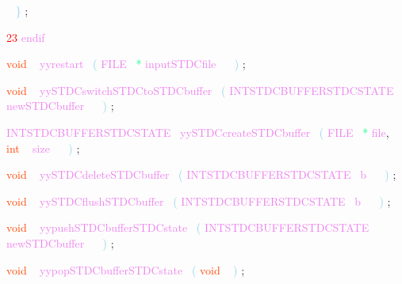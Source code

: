 \documentclass[8, usernames, dvipsnames]{beamer}
\begin{document}
\begin{frame}
\textcolor{White}{\   }
\textcolor{SkyBlue}{\} }
\textcolor{Sepia}{;}

  \textcolor{Red}{23}
\textcolor{Violet}{endif}\textcolor{White}{\ }

 
 \textcolor{OrangeRed}{void}
\textcolor{White}{\ }
\textcolor{Violet}{yyrestart}\textcolor{White}{\ }
\textcolor{SkyBlue}{(}
\textcolor{Violet}{FILE}\textcolor{White}{\ }
\textcolor{SpringGreen}{*}
\textcolor{Violet}{inputSTDCfile}\textcolor{White}{\ }
\textcolor{White}{\ }
\textcolor{SkyBlue}{)}
\textcolor{Sepia}{;}

 \textcolor{OrangeRed}{void}
\textcolor{White}{\ }
\textcolor{Violet}{yySTDCswitchSTDCtoSTDCbuffer}\textcolor{White}{\ }
\textcolor{SkyBlue}{(}
\textcolor{Violet}{INTSTDCBUFFERSTDCSTATE}\textcolor{White}{\ }
\textcolor{Violet}{newSTDCbuffer}\textcolor{White}{\ }
\textcolor{White}{\ }
\textcolor{SkyBlue}{)}
\textcolor{Sepia}{;}

 \textcolor{Violet}{INTSTDCBUFFERSTDCSTATE}\textcolor{White}{\ }
\textcolor{Violet}{yySTDCcreateSTDCbuffer}\textcolor{White}{\ }
\textcolor{SkyBlue}{(}
\textcolor{Violet}{FILE}\textcolor{White}{\ }
\textcolor{SpringGreen}{*}
\textcolor{Violet}{file}\textcolor{Sepia}{,}
\textcolor{OrangeRed}{int}
\textcolor{White}{\ }
\textcolor{Violet}{size}\textcolor{White}{\ }
\textcolor{White}{\ }
\textcolor{SkyBlue}{)}
\textcolor{Sepia}{;}

 \textcolor{OrangeRed}{void}
\textcolor{White}{\ }
\textcolor{Violet}{yySTDCdeleteSTDCbuffer}\textcolor{White}{\ }
\textcolor{SkyBlue}{(}
\textcolor{Violet}{INTSTDCBUFFERSTDCSTATE}\textcolor{White}{\ }
\textcolor{Violet}{b}\textcolor{White}{\ }
\textcolor{White}{\ }
\textcolor{SkyBlue}{)}
\textcolor{Sepia}{;}

 \textcolor{OrangeRed}{void}
\textcolor{White}{\ }
\textcolor{Violet}{yySTDCflushSTDCbuffer}\textcolor{White}{\ }
\textcolor{SkyBlue}{(}
\textcolor{Violet}{INTSTDCBUFFERSTDCSTATE}\textcolor{White}{\ }
\textcolor{Violet}{b}\textcolor{White}{\ }
\textcolor{White}{\ }
\textcolor{SkyBlue}{)}
\textcolor{Sepia}{;}

 \textcolor{OrangeRed}{void}
\textcolor{White}{\ }
\textcolor{Violet}{yypushSTDCbufferSTDCstate}\textcolor{White}{\ }
\textcolor{SkyBlue}{(}
\textcolor{Violet}{INTSTDCBUFFERSTDCSTATE}\textcolor{White}{\ }
\textcolor{Violet}{newSTDCbuffer}\textcolor{White}{\ }
\textcolor{White}{\ }
\textcolor{SkyBlue}{)}
\textcolor{Sepia}{;}

 \textcolor{OrangeRed}{void}
\textcolor{White}{\ }
\textcolor{Violet}{yypopSTDCbufferSTDCstate}\textcolor{White}{\ }
\textcolor{SkyBlue}{(}
\textcolor{OrangeRed}{void}
\textcolor{White}{\ }
\textcolor{SkyBlue}{)}
\textcolor{Sepia}{;}

 \end{frame}
\end{document}
